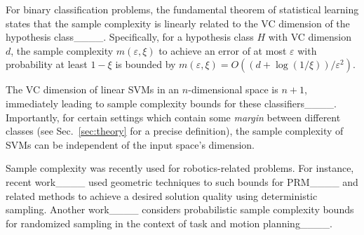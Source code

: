 For binary classification problems, the fundamental theorem of statistical learning states that the sample complexity is linearly related to the VC dimension of the hypothesis class____. 
Specifically, for a hypothesis class $H$ with VC dimension $d$, the sample complexity $m(\varepsilon, \xi)$ to achieve an error of at most $\varepsilon$ with probability at least $1-\xi$ is bounded by 
$
m(\varepsilon, \xi) = O\left({(d + \log(1/\xi))} / {\varepsilon^2}\right)
$.

The VC dimension of linear SVMs in an $n$-dimensional space is $n+1$, immediately leading to sample complexity bounds for these classifiers____.
%
Importantly, for certain  settings which contain some \emph{margin} between different classes (see Sec.~\ref{sec:theory} for a precise definition), the sample complexity of SVMs can be independent of the input space's dimension.

Sample complexity was recently used for robotics-related problems.
%
For instance, recent work____  used geometric techniques to such  bounds for PRM____ and related methods to achieve a desired solution quality using deterministic sampling. Another work____ considers probabilistic sample complexity bounds for randomized sampling in the context of task and motion planning____.


